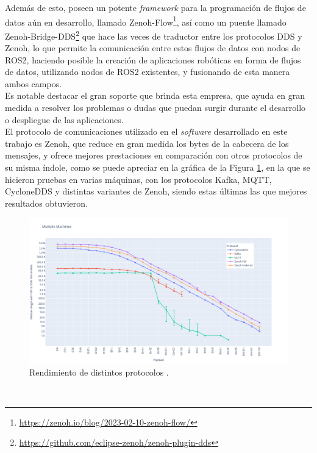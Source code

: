 Además de esto, poseen un potente \textit{framework} para la programación de
flujos de datos aún en desarrollo, llamado
Zenoh-Flow\footnote{\url{https://zenoh.io/blog/2023-02-10-zenoh-flow/}}, así
como un puente llamado
Zenoh-Bridge-DDS\footnote{\url{https://github.com/eclipse-zenoh/zenoh-plugin-dds}}
que hace las veces de traductor entre los protocolos DDS y Zenoh, lo que permite
la comunicación entre estos flujos de datos con nodos de ROS2, haciendo posible
la creación de aplicaciones robóticas en forma de flujos de datos, utilizando
nodos de ROS2 existentes, y fusionando de esta manera ambos campos.
\\

Es notable destacar el gran soporte que brinda esta empresa, que ayuda en gran
medida a resolver los problemas o dudas que puedan surgir durante el desarrollo o
despliegue de las aplicaciones.
\\

El protocolo de comunicaciones utilizado en el \textit{software} desarrollado en
este trabajo es Zenoh, que reduce en gran medida los bytes de la cabecera de los
mensajes, y ofrece mejores prestaciones en comparación con otros protocolos de
su misma índole, como se puede apreciar en la gráfica de la Figura
\ref{fig:zenoh_performance}, en la que se hicieron pruebas en varias máquinas,
con los protocolos Kafka, MQTT, CycloneDDS y distintas variantes de Zenoh,
siendo estas últimas las que mejores resultados obtuvieron.
\\

\begin{figure} [h!]
  \begin{center}
    \includegraphics[width=15cm]{figs/zenoh_performance}
  \end{center}
  \caption{Rendimiento de distintos protocolos \cite{zenoh_performance}.}
  \label{fig:zenoh_performance}
\end{figure}\

